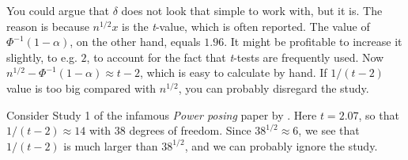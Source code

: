 You could argue that $\delta$ does not look that simple to work with, but it is. The reason is because $n^{1/2}x$ is the \textit{t}-value, which is often reported. The value of $\Phi^{-1}(1-\alpha)$, on the other hand, equals $1.96$. It might be profitable to increase it slightly, to e.g. $2$, to account for the fact that \textit{t}-tests are frequently used. Now $n^{1/2} - \Phi^{-1}(1-\alpha) \approx t - 2$, which is easy to calculate by hand. If $1/(t - 2)$ value is too big compared with $n^{1/2}$, you can probably disregard the study. 

Consider Study 1 of the infamous \emph{Power posing} paper by \cite{Carney2010-we}. Here $t = 2.07$, so that $1/(t - 2) \approx 14$ with $38$ degrees of freedom. Since $38^{1/2} \approx 6$, we see that $1/(t - 2)$ is much larger than $38^{1/2}$, and we can probably ignore the study.

